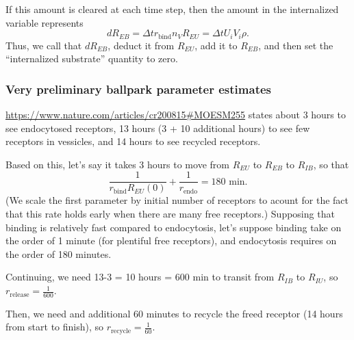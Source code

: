 \documentclass[12point]{article}
\begin{document}
If this amount is cleared at each time step, then the amount in the internalized variable 
represents 
\begin{equation}
dR_{EB} = \Delta t r_\textrm{bind} n_V R_{EU} = \Delta t U_i V_i \rho.
\end{equation}
Thus, we call that $dR_{EB}$, deduct it from $R_{EU}$, add it to $R_{EB}$, and then 
set the ``internalized substrate'' quantity to zero. 

\subsubsection{Very preliminary ballpark parameter estimates}
\href{https://www.nature.com/articles/cr200815#MOESM255}{https://www.nature.com/articles/cr200815\#MOESM255} states about 3 hours to see endocytosed receptors, 13 hours (3 + 10 additional hours) to see few receptors in vessicles, and 14 hours to see recycled receptors. 

Based on this, let's say it takes 3 hours to move from $R_{EU}$ to $R_{EB}$ to $R_{IB}$, so that
\begin{equation}
\frac{ 1 }{ r_\textrm{bind} R_{EU}(0) } + \frac{1}{r_\textrm{endo}} = 180 \textrm{ min}. 
\end{equation}
(We scale the first parameter by initial number of receptors to acount for the fact that this rate holds early when there are many free receptors.) 
Supposing that binding is relatively fast compared to endocytosis, let's suppose binding take on the order of 1 minute (for plentiful free receptors), and endocytosis requires on the order of 180 minutes. 

Continuing, we need 13-3 = 10 hours = 600 min to transit from $R_{IB}$ to $R_{IU}$, so $r_\textrm{release} = \frac{1}{600}$. 

Then, we need and additional 60 minutes to recycle the freed receptor (14 hours from start to finish), so $r_\textrm{recycle} = \frac{1}{60}.$ 
\end{document}
